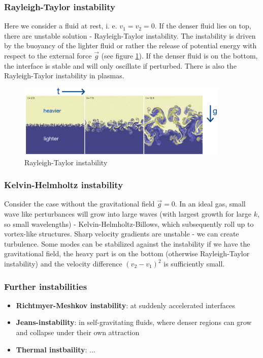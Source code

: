 \subsubsection{Rayleigh-Taylor instability}
Here we consider a fluid at rest, i. e. $v_1=v_2=0$. If the denser fluid lies on top, there are unstable solution - Rayleigh-Taylor instability.
The instability is driven by the buoyancy of the lighter fluid or rather the release of potential energy with respect to the external force $\vec{g}$ (see figure \ref{fig:rayleigh_taylor}).
If the denser fluid is on the bottom, the interface is stable and will only oscillate if perturbed. There is also the Rayleigh-Taylor instability in plasmas.

\begin{figure}[!htb]
    \centering
    \includegraphics[width=0.9\textwidth]{figures/rayleigh_taylor.png}
    \caption{Rayleigh-Taylor instability}
    \label{fig:rayleigh_taylor}
\end{figure}

\subsubsection{Kelvin-Helmholtz instability}
Consider the case without the gravitational field $\vec{g} = 0$. In an ideal gas, small wave like perturbances will grow into large waves (with largest growth for large $k$, so small wavelengths) - Kelvin-Helmholtz-Billows, which subsequently roll up to vortex-like structures.
Sharp velocity gradients are unstable - we can create turbulence.
Some modes can be stabilized against the instability if we have the gravitational field, the heavy part is on the bottom (otherwise Rayleigh-Taylor instability) and
the velocity difference $(v_2 - v_1)^2$ is sufficiently small.

\subsubsection{Further instabilities}
\begin{itemize}
    \item \textbf{Richtmyer-Meshkov instability}: at suddenly accelerated interfaces
    \item \textbf{Jeans-instability}: in self-gravitating fluids, where denser regions can grow and collapse under their own attraction
    \item \textbf{Thermal instbaility}: $\dots$
\end{itemize}


